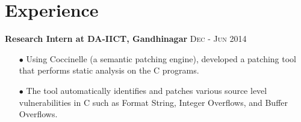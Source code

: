 \documentclass[letterpaper,11pt]{article}
\begin{document}

\section{Experience}

%
\normalsize{\textbf {Research Intern at \textsc{DA-IICT}, Gandhinagar }} \hfill{\textsc{Dec - Jun 2014}}
{
\begin{itemize}\setlength{\itemsep}{-1pt}
        \item [$\bullet$] Using Coccinelle (a semantic patching engine), developed a patching tool that performs static analysis on the C programs.
        \item [$\bullet$] The tool automatically identifies and patches various source level vulnerabilities in C such as Format String, Integer Overflows, and Buffer Overflows.\\[-3mm]
     \end{itemize}
}






\end{document}
